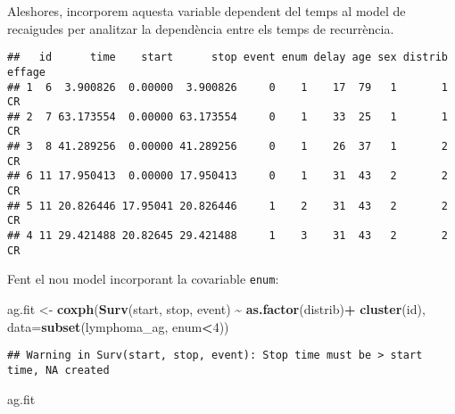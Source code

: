 \documentclass[
]{article}
\newenvironment{Shaded}{\begin{snugshade}}{\end{snugshade}}
\newcommand{\AttributeTok}[1]{\textcolor[rgb]{0.13,0.29,0.53}{#1}}
\newcommand{\DecValTok}[1]{\textcolor[rgb]{0.00,0.00,0.81}{#1}}
\newcommand{\FunctionTok}[1]{\textcolor[rgb]{0.13,0.29,0.53}{\textbf{#1}}}
\newcommand{\NormalTok}[1]{#1}
\newcommand{\OtherTok}[1]{\textcolor[rgb]{0.56,0.35,0.01}{#1}}
\newcommand{\SpecialCharTok}[1]{\textcolor[rgb]{0.81,0.36,0.00}{\textbf{#1}}}
\begin{document}
Aleshores, incorporem aquesta variable dependent del temps al model de
recaigudes per analitzar la dependència entre els temps de recurrència.

\begin{Shaded}
\end{Shaded}

\begin{verbatim}
##   id      time    start      stop event enum delay age sex distrib effage
## 1  6  3.900826  0.00000  3.900826     0    1    17  79   1       1     CR
## 2  7 63.173554  0.00000 63.173554     0    1    33  25   1       1     CR
## 3  8 41.289256  0.00000 41.289256     0    1    26  37   1       2     CR
## 6 11 17.950413  0.00000 17.950413     0    1    31  43   2       2     CR
## 5 11 20.826446 17.95041 20.826446     1    2    31  43   2       2     CR
## 4 11 29.421488 20.82645 29.421488     1    3    31  43   2       2     CR
\end{verbatim}

Fent el nou model incorporant la covariable \texttt{enum}:

\begin{Shaded}
\begin{Highlighting}[]
\NormalTok{ag.fit }\OtherTok{\textless{}{-}} \FunctionTok{coxph}\NormalTok{(}\FunctionTok{Surv}\NormalTok{(start, stop, event) }\SpecialCharTok{\textasciitilde{}} \FunctionTok{as.factor}\NormalTok{(distrib)}\SpecialCharTok{+}
                  \FunctionTok{cluster}\NormalTok{(id), }\AttributeTok{data=}\FunctionTok{subset}\NormalTok{(lymphoma\_ag, enum}\SpecialCharTok{\textless{}}\DecValTok{4}\NormalTok{))}
\end{Highlighting}
\end{Shaded}

\begin{verbatim}
## Warning in Surv(start, stop, event): Stop time must be > start time, NA created
\end{verbatim}

\begin{Shaded}
\begin{Highlighting}[]
\NormalTok{ag.fit}
\end{Highlighting}
\end{Shaded}
\end{document}
